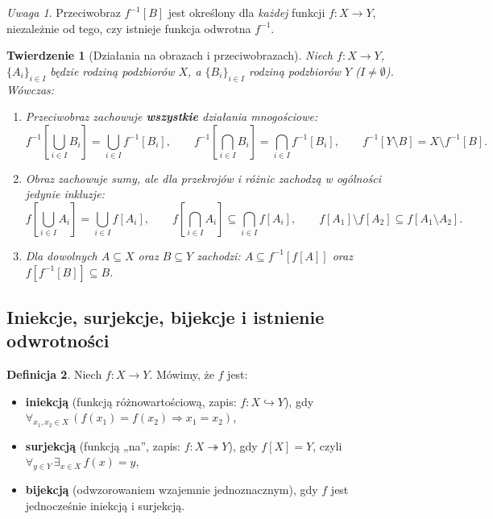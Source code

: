 \documentclass[11pt, a4paper]{article}
\theoremstyle{definition}
\newtheorem{definicja}{Definicja}[section]
\theoremstyle{plain}
\newtheorem{twierdzenie}[definicja]{Twierdzenie}
\theoremstyle{remark}
\newtheorem*{uwaga}{Uwaga}
\begin{document}
\begin{uwaga}
Przeciwobraz $f^{-1}[B]$ jest określony dla \emph{każdej} funkcji $f : X \to Y$, niezależnie od tego, czy istnieje funkcja odwrotna $f^{-1}$.
\end{uwaga}

\begin{twierdzenie}[Działania na obrazach i przeciwobrazach]
Niech $f : X \to Y$, $\{A_i\}_{i \in I}$ będzie rodziną podzbiorów $X$, a $\{B_i\}_{i \in I}$ rodziną podzbiorów $Y$ ($I \neq \emptyset$). Wówczas:
\begin{enumerate}
    \item Przeciwobraz zachowuje \textbf{wszystkie} działania mnogościowe:
    \[
        f^{-1}\!\left[\bigcup_{i \in I} B_i\right] = \bigcup_{i \in I} f^{-1}[B_i], \qquad
        f^{-1}\!\left[\bigcap_{i \in I} B_i\right] = \bigcap_{i \in I} f^{-1}[B_i], \qquad
        f^{-1}[Y \setminus B] = X \setminus f^{-1}[B].
    \]
    \item Obraz zachowuje sumy, ale dla przekrojów i różnic zachodzą w ogólności jedynie inkluzje:
    \[
        f\!\left[\bigcup_{i \in I} A_i\right] = \bigcup_{i \in I} f[A_i], \qquad
        f\!\left[\bigcap_{i \in I} A_i\right] \subseteq \bigcap_{i \in I} f[A_i], \qquad
        f[A_1] \setminus f[A_2] \subseteq f[A_1 \setminus A_2].
    \]
    \item Dla dowolnych $A \subseteq X$ oraz $B \subseteq Y$ zachodzi: $A \subseteq f^{-1}[f[A]]$ oraz $f[f^{-1}[B]] \subseteq B$.
\end{enumerate}
\end{twierdzenie}

\subsection{Iniekcje, surjekcje, bijekcje i istnienie odwrotności}

\begin{definicja}
Niech $f : X \to Y$. Mówimy, że $f$ jest:
\begin{itemize}
    \item \textbf{iniekcją} (funkcją różnowartościową, zapis: $f : X \hookrightarrow Y$), gdy $\forall_{x_1, x_2 \in X}\, (f(x_1) = f(x_2) \Rightarrow x_1 = x_2)$,
    \item \textbf{surjekcją} (funkcją „na”, zapis: $f : X \twoheadrightarrow Y$), gdy $f[X] = Y$, czyli $\forall_{y \in Y}\, \exists_{x \in X}\, f(x) = y$,
    \item \textbf{bijekcją} (odwzorowaniem wzajemnie jednoznacznym), gdy $f$ jest jednocześnie iniekcją i surjekcją.
\end{itemize}
\end{definicja}
\end{document}

